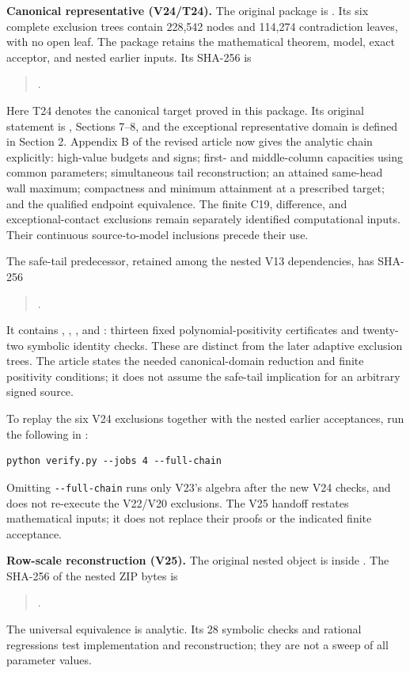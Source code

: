 \documentclass[10pt]{article}
\begin{document}
\textbf{Canonical representative (V24/T24).}
The original package is
.
Its six complete exclusion trees contain 228,542 nodes and 114,274
contradiction leaves, with no open leaf. The package retains the
mathematical theorem, model, exact acceptor, and nested earlier inputs.
Its SHA-256 is
\begin{quote}
.
\end{quote}
Here T24 denotes the canonical target proved in this package.
Its original statement is , Sections
7--8, and the exceptional representative domain is defined in
Section 2. Appendix B of the revised article now gives the analytic
chain explicitly: high-value budgets and signs; first- and
middle-column capacities using common parameters; simultaneous tail
reconstruction; an attained same-head wall maximum; compactness and
minimum attainment at a prescribed target; and the qualified endpoint
equivalence. The finite C19, difference, and exceptional-contact
exclusions remain separately identified computational inputs. Their
continuous source-to-model inclusions precede their use.

The safe-tail predecessor, retained among the nested V13 dependencies,
has SHA-256
\begin{quote}
.
\end{quote}
It contains , ,
, and : thirteen fixed
polynomial-positivity certificates and twenty-two symbolic identity
checks. These are distinct from the later adaptive exclusion trees.
The article states the needed canonical-domain reduction and finite
positivity conditions; it does not assume the safe-tail implication
for an arbitrary signed source.

To replay the six V24 exclusions together with the nested earlier
acceptances, run the following in :
\begin{verbatim}
python verify.py --jobs 4 --full-chain
\end{verbatim}
Omitting \verb|--full-chain| runs only
V23's algebra after the new V24 checks, and does not re-execute the
V22/V20 exclusions. The V25 handoff restates mathematical inputs; it
does not replace their proofs or the indicated finite acceptance.

\textbf{Row-scale reconstruction (V25).}
The original nested object is
inside
.
The SHA-256 of the nested ZIP bytes is
\begin{quote}
.
\end{quote}
The universal equivalence is analytic. Its 28 symbolic checks and
rational regressions test implementation and reconstruction; they are
not a sweep of all parameter values.
\end{document}
